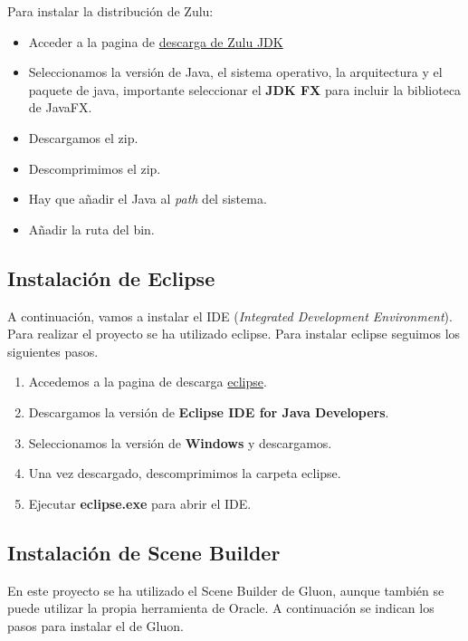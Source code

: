 Para instalar la distribución de Zulu:
\begin{itemize}
	\item Acceder a la pagina de  \href{https://www.azul.com/downloads/zulu-community/}{descarga de Zulu JDK}
	\item Seleccionamos la versión de Java, el sistema operativo, la arquitectura y el paquete de java, importante seleccionar el \textbf{JDK FX} para incluir la biblioteca de JavaFX.
	\item Descargamos el zip.
	\item Descomprimimos el zip.
	\item Hay que añadir el Java al \emph{path} del sistema.
	\item Añadir la ruta del bin.
	
\end{itemize}

\subsection{Instalación de Eclipse}
A continuación, vamos a instalar el IDE (\emph{Integrated Development Environment}). Para realizar el proyecto se ha utilizado eclipse. Para instalar eclipse seguimos los siguientes pasos.

\begin{enumerate}
	\item Accedemos a la pagina de descarga \href{https://www.eclipse.org/downloads/packages/}{eclipse}.
	\item Descargamos la versión de \textbf{Eclipse IDE for Java Developers}.
	\item Seleccionamos la versión de \textbf{Windows} y descargamos.
	\item Una vez descargado, descomprimimos la carpeta eclipse.
	\item Ejecutar \textbf{eclipse.exe} para abrir el IDE.
\end{enumerate}

\subsection{Instalación de Scene Builder}
En este proyecto se ha utilizado el Scene Builder de Gluon, aunque también se puede utilizar la propia herramienta de Oracle. A continuación se indican los pasos para instalar el de Gluon.


